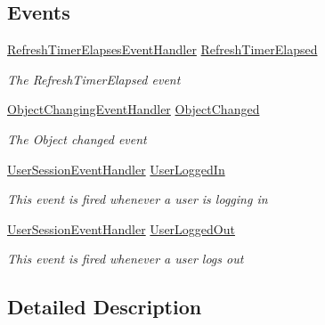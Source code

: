 \subsection*{Events}
\begin{DoxyCompactItemize}
\item 
\hyperlink{class_plex_byte_1_1_mo_cap_1_1_managers_1_1_object_manager_a47b52df5c51e0f9e7200716fa0235e51}{Refresh\+Timer\+Elapses\+Event\+Handler} \hyperlink{class_plex_byte_1_1_mo_cap_1_1_managers_1_1_object_manager_a3959ab01579b06c6f5e96b36761e6d44}{Refresh\+Timer\+Elapsed}
\begin{DoxyCompactList}\small\item\em The Refresh\+Timer\+Elapsed event \end{DoxyCompactList}\item 
\hyperlink{class_plex_byte_1_1_mo_cap_1_1_managers_1_1_object_manager_a0ba242dc52a4fcf291b73aeb36dbc51f}{Object\+Changing\+Event\+Handler} \hyperlink{class_plex_byte_1_1_mo_cap_1_1_managers_1_1_object_manager_a84f1c6e8b0f7c6e6037c31c4fcfa3b14}{Object\+Changed}
\begin{DoxyCompactList}\small\item\em The Object changed event \end{DoxyCompactList}\item 
\hyperlink{class_plex_byte_1_1_mo_cap_1_1_managers_1_1_object_manager_a16a70a9ab581238824804eeb45de48b8}{User\+Session\+Event\+Handler} \hyperlink{class_plex_byte_1_1_mo_cap_1_1_managers_1_1_object_manager_ae5b35db2e937c6f2c6e43b612cde9c18}{User\+Logged\+In}
\begin{DoxyCompactList}\small\item\em This event is fired whenever a user is logging in \end{DoxyCompactList}\item 
\hyperlink{class_plex_byte_1_1_mo_cap_1_1_managers_1_1_object_manager_a16a70a9ab581238824804eeb45de48b8}{User\+Session\+Event\+Handler} \hyperlink{class_plex_byte_1_1_mo_cap_1_1_managers_1_1_object_manager_a393d90bbcf2a71162eca1752bed2210d}{User\+Logged\+Out}
\begin{DoxyCompactList}\small\item\em This event is fired whenever a user logs out \end{DoxyCompactList}\end{DoxyCompactItemize}


\subsection{Detailed Description}


